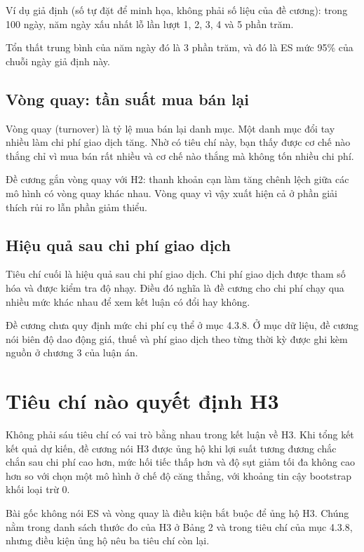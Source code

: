 \begin{tcolorbox}[breakable]
Ví dụ giả định (số tự đặt để minh họa, không phải số liệu của đề cương): trong 100 ngày, năm ngày xấu nhất lỗ lần lượt 1, 2, 3, 4 và 5 phần trăm.

Tổn thất trung bình của năm ngày đó là 3 phần trăm, và đó là ES mức 95\% của chuỗi ngày giả định này.
\end{tcolorbox}

\subsection{Vòng quay: tần suất mua bán lại}

Vòng quay (turnover) là tỷ lệ mua bán lại danh mục. Một danh mục đổi tay nhiều làm chi phí giao dịch tăng. Nhờ có tiêu chí này, bạn thấy được cơ chế nào thắng chỉ vì mua bán rất nhiều và cơ chế nào thắng mà không tốn nhiều chi phí.

Đề cương gắn vòng quay với H2: thanh khoản cạn làm tăng chênh lệch giữa các mô hình có vòng quay khác nhau. Vòng quay vì vậy xuất hiện cả ở phần giải thích rủi ro lẫn phần giảm thiểu.

\subsection{Hiệu quả sau chi phí giao dịch}

Tiêu chí cuối là hiệu quả sau chi phí giao dịch. Chi phí giao dịch được tham số hóa và được kiểm tra độ nhạy. Điều đó nghĩa là đề cương cho chi phí chạy qua nhiều mức khác nhau để xem kết luận có đổi hay không.

Đề cương chưa quy định mức chi phí cụ thể ở mục 4.3.8. Ở mục dữ liệu, đề cương nói biên độ dao động giá, thuế và phí giao dịch theo từng thời kỳ được ghi kèm nguồn ở chương 3 của luận án.

\section{Tiêu chí nào quyết định H3}

Không phải sáu tiêu chí có vai trò bằng nhau trong kết luận về H3. Khi tổng kết kết quả dự kiến, đề cương nói H3 được ủng hộ khi lợi suất tương đương chắc chắn sau chi phí cao hơn, mức hối tiếc thấp hơn và độ sụt giảm tối đa không cao hơn so với chọn một mô hình ở chế độ căng thẳng, với khoảng tin cậy bootstrap khối loại trừ 0.

Bài gốc không nói ES và vòng quay là điều kiện bắt buộc để ủng hộ H3. Chúng nằm trong danh sách thước đo của H3 ở Bảng 2 và trong tiêu chí của mục 4.3.8, nhưng điều kiện ủng hộ nêu ba tiêu chí còn lại.

